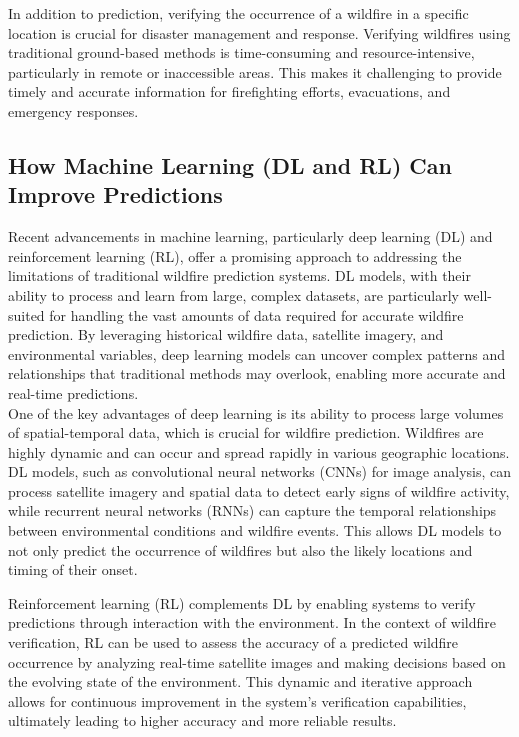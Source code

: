\documentclass[conference]{IEEEtran}
\begin{document}
In addition to prediction, verifying the occurrence of a wildfire in a specific location is crucial for disaster management and response. Verifying wildfires using traditional ground-based methods is time-consuming and resource-intensive, particularly in remote or inaccessible areas. This makes it challenging to provide timely and accurate information for firefighting efforts, evacuations, and emergency responses.\\

\subsection{How Machine Learning (DL and RL) Can Improve Predictions}
Recent advancements in machine learning, particularly deep learning (DL) and reinforcement learning (RL), offer a promising approach to addressing the limitations of traditional wildfire prediction systems. DL models, with their ability to process and learn from large, complex datasets, are particularly well-suited for handling the vast amounts of data required for accurate wildfire prediction. By leveraging historical wildfire data, satellite imagery, and environmental variables, deep learning models can uncover complex patterns and relationships that traditional methods may overlook, enabling more accurate and real-time predictions.\\

\noindent
One of the key advantages of deep learning is its ability to process large volumes of spatial-temporal data, which is crucial for wildfire prediction. Wildfires are highly dynamic and can occur and spread rapidly in various geographic locations. DL models, such as convolutional neural networks (CNNs) for image analysis, can process satellite imagery and spatial data to detect early signs of wildfire activity, while recurrent neural networks (RNNs) can capture the temporal relationships between environmental conditions and wildfire events. This allows DL models to not only predict the occurrence of wildfires but also the likely locations and timing of their onset.

\noindent
Reinforcement learning (RL) complements DL by enabling systems to verify predictions through interaction with the environment. In the context of wildfire verification, RL can be used to assess the accuracy of a predicted wildfire occurrence by analyzing real-time satellite images and making decisions based on the evolving state of the environment. This dynamic and iterative approach allows for continuous improvement in the system’s verification capabilities, ultimately leading to higher accuracy and more reliable results.
\end{document}
